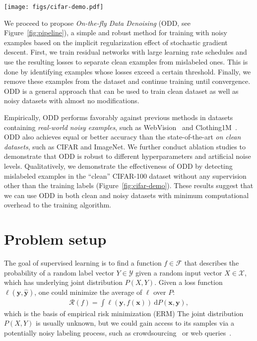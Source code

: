 \documentclass[a4paper,11pt]{article}
\newcommand{\mc}[1]{\mathcal{#1}}
\def\rvx{{\mathbf{x}}}
\def\rvy{{\mathbf{y}}}
\begin{document}
\begin{figure*}[t]
    \centering
    \texttt{[image: figs/cifar-demo.pdf]}
    \caption{Mislabeled examples in the CIFAR-100 training set detected by \textsc{ODD}.}
    \label{fig:cifar-demo}
\end{figure*}

We proceed to propose \textit{On-the-fly Data Denoising} (\textsc{ODD}, see Figure~\ref{fig:pipeline}), a simple and robust method for training with noisy examples based on the implicit regularization effect of stochastic gradient descent.
First, we train residual networks with large learning rate schedules and use the resulting losses to separate clean examples from mislabeled ones. 
This is done by identifying examples whose losses exceed a certain threshold. 
Finally, we remove these examples from the dataset and continue training until convergence. \textsc{ODD} is a general approach that can be used to train clean dataset as well as noisy datasets with almost no modifications.




Empirically, \textsc{ODD} performs favorably against previous methods in datasets containing \textit{real-world noisy examples}, such as WebVision~\cite{li2017webvision} and Clothing1M~\cite{xiao2015learning}. \textsc{ODD} also achieves equal or better accuracy than the state-of-the-art \textit{on clean datasets}, such as CIFAR and ImageNet. 
We further conduct ablation studies to demonstrate that \textsc{ODD} is robust to different hyperparameters and artificial noise levels. Qualitatively, we demonstrate the effectiveness of \textsc{ODD} by detecting mislabeled examples in the ``clean'' CIFAR-100 dataset without any supervision other than the training labels (Figure~\ref{fig:cifar-demo}). These results suggest that we can use \textsc{ODD} in both clean and noisy datasets with minimum computational overhead to the training algorithm. 



 \section{Problem setup}

The goal of supervised learning is to find a function $f \in \mc{F}$ that describes the probability of a random label vector $Y \in \mc{Y}$ given a random input vector $X \in \mc{X}$, which has underlying joint distribution $P(X, Y)$. Given a loss function $\ell(\rvy, \hat{\rvy})$, one could minimize the average of $\ell$ over $P$:
\begin{align}
\mc{R}(f) = \int \ell(\rvy, f(\rvx)) \ \mathrm{d} P(\rvx, \rvy), \label{eq:erm}
\end{align}
which is the basis of empirical risk minimization (\textsc{ERM})
The joint distribution $P(X, Y)$ is usually unknown, but we could gain access to its samples via a potentially noisy labeling process, such as crowdsourcing~\cite{krishna2016embracing} or web queries~\cite{li2017webvision}. 
\end{document}
